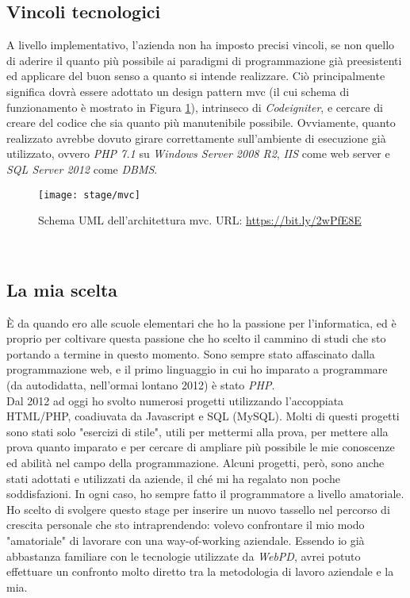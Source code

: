 \subsection{Vincoli tecnologici}
A livello implementativo, l'azienda non ha imposto precisi vincoli, se non quello di aderire il quanto più possibile ai paradigmi di programmazione già preesistenti ed applicare del buon senso a quanto si intende realizzare. Ciò principalmente significa dovrà essere adottato un design pattern \gls{mvc} (il cui schema di funzionamento è mostrato in Figura \ref{figura:mvc}), intrinseco di \textit{Codeigniter}, e cercare di creare del codice che 
sia quanto più manutenibile possibile. Ovviamente, quanto realizzato avrebbe dovuto girare correttamente sull'ambiente di esecuzione già utilizzato, ovvero \textit{PHP 7.1} su \textit{Windows Server 2008 R2}, \textit{IIS} come web server e \textit{SQL Server 2012} come \textit{\gls{DBMS}}.
\begin{figure}[!h] 
	\centering 
	\texttt{[image: stage/mvc]} 
	\caption{Schema UML dell'architettura \gls{mvc}. URL: \url{https://bit.ly/2wPfE8E} }
	\label{figura:mvc}
\end{figure}\\

\subsection{La mia scelta}
È da quando ero alle scuole elementari che ho la passione per l'informatica, ed è proprio per coltivare questa passione che ho scelto il cammino di studi che sto portando a termine in questo momento. Sono sempre stato affascinato dalla programmazione web, e il primo linguaggio in cui ho imparato a programmare (da autodidatta, nell'ormai lontano 2012) è stato \textit{PHP}.\\
Dal 2012 ad oggi ho svolto numerosi progetti utilizzando l'accoppiata HTML/PHP, coadiuvata da Javascript e SQL (MySQL). Molti di questi progetti sono stati solo "esercizi di stile", utili per mettermi alla prova, per mettere alla prova quanto imparato e per cercare di ampliare più possibile le mie conoscenze ed abilità nel campo della programmazione. Alcuni progetti, però, sono anche stati adottati e utilizzati da aziende, il ché mi ha regalato non poche soddisfazioni. In ogni caso, ho sempre fatto il programmatore a livello amatoriale.\\
Ho scelto di svolgere questo stage per inserire un nuovo tassello nel percorso di crescita personale che sto intraprendendo: volevo confrontare il mio modo "amatoriale" di lavorare con una way-of-working aziendale. Essendo io già abbastanza familiare con le tecnologie utilizzate da \textit{WebPD}, avrei potuto effettuare un confronto molto diretto tra la metodologia di lavoro aziendale e la mia. 